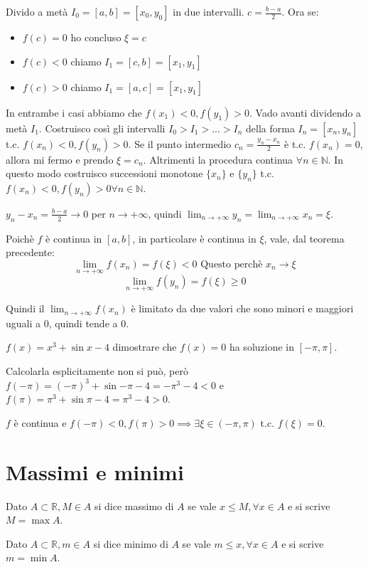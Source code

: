 \begin{dimostration}
    Divido a metà $I_0=[a,b]=[x_0,y_0]$ in due intervalli. $c=\frac{b-a}{2}$.
    Ora se:
    \begin{itemize}
        \item[-] $f(c)=0$ ho concluso $\xi=c$
        \item[-] $f(c)<0$ chiamo $I_1=[c,b]=[x_1,y_1]$
        \item[-] $f(c)>0$ chiamo $I_1=[a,c]=[x_1,y_1]$
    \end{itemize}
    In entrambe i casi abbiamo che $f(x_1)<0, f(y_1)>0$. Vado avanti dividendo a metà $I_1$. Costruisco così gli intervalli $I_0>I_1>\text{...}>I_n$ della forma $I_n=[x_n,y_n]$ t.c. $f(x_n)<0, f(y_n)>0$. Se il punto intermedio $c_n=\frac{y_n-x_n}{2}$ è t.c. $f(x_n)=0$, allora mi fermo e prendo $\xi=c_n$. Altrimenti la procedura continua $\forall n\in\mathbb{N}$. In questo modo costruisco successioni monotone $\{x_n\}$ e $\{y_n\}$ t.c. $f(x_n)<0, f(y_n)>0 \forall n\in\mathbb{N}$.
    
    $y_n-x_n=\frac{b-a}{2}\to 0$ per $n\to+\infty$, quindi $\lim_{n\to+\infty}y_n=\lim_{n\to+\infty}x_n=\xi$.
    
    Poichè $f$ è continua in $[a,b]$, in particolare è continua in $\xi$, vale, dal teorema precedente:
    \begin{equation*}
        \lim_{n\to+\infty}f(x_n)=f(\xi)<0\text{ Questo perchè }x_n\to\xi
    \end{equation*}
\begin{equation*}
    \lim_{n\to+\infty}f(y_n)=f(\xi)\geq 0
\end{equation*}

Quindi il $\lim_{n\to+\infty}f(x_n)$ è limitato da due valori che sono minori e maggiori uguali a 0, quindi tende a 0.\flushright{$\blacksquare$}
\end{dimostration}

\begin{example}
    $f(x)=x^3+\sin x-4$ dimostrare che $f(x)=0$ ha soluzione in $[-\pi,\pi]$.
    
    Calcolarla esplicitamente non si può, però $f(-\pi)=(-\pi)^3+\sin{-\pi}-4=-\pi^3-4<0$ e$f(\pi)=\pi^3+\sin{\pi}-4=\pi^3-4>0$.
    
    $f$ è continua e $f(-\pi)<0, f(\pi)>0\implies\exists\xi\in(-\pi,\pi)\text{ t.c. }f(\xi)=0$.
\end{example}


\section{Massimi e minimi}
\begin{definition}[Massimo]
    Dato $A\subset\mathbb{R}, M\in A$ si dice massimo di $A$ se vale $x\leq M, \forall x\in A$ e si scrive $M=\max{A}$.
\end{definition}
\begin{definition}[Minimo]
    Dato $A\subset\mathbb{R}, m\in A$ si dice minimo di $A$ se vale $m\leq x, \forall x\in A$ e si scrive $m=\min{A}$.
\end{definition}

